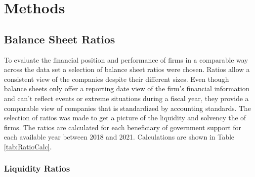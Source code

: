 
\chapter{Methods} %

\label{Chapter4} %



\section{Balance Sheet Ratios}
\label{section:BSratios}

To evaluate the financial position and performance of firms in a comparable way across the data set a selection of balance sheet ratios were chosen. Ratios allow a consistent view of the companies despite their different sizes. Even though balance sheets only offer a reporting date view of the firm's financial information and can't reflect events or extreme situations during a fiscal year, they provide a comparable view of companies that is standardized by accounting standards.  The selection of ratios was made to get a picture of the liquidity and solvency the of firms. The ratios are calculated for each beneficiary of government support for each available year between 2018 and 2021. Calculations are shown in Table \ref{tab:RatioCalc}.

\subsection{Liquidity Ratios}

